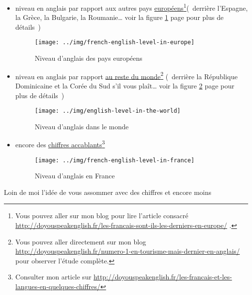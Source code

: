 \begin{itemize}
\item niveau en anglais par rapport aux autres pays
  \href{http://doyouspeakenglish.fr/les-francais-sont-ils-les-derniers-en-europe/}{européens}\footnote{Vous
    pouvez aller sur mon blog pour lire l'article consacré
    \url{http://doyouspeakenglish.fr/les-francais-sont-ils-les-derniers-en-europe/} .}(~derrière l'Espagne, la Grèce, la Bulgarie, la Roumanie\ldots{} voir la figure
  \ref{fig:1} page \pageref{fig:1} pour plus de détails~)
  \begin{figure}[h]
    \centering
    \caption[L'anglais en Europe]{Niveau d'anglais des
      pays européens}\vspace{.1cm}
    \texttt{[image: ../img/french-english-level-in-europe]}
    
    \label{fig:1}
  \end{figure}
\item niveau en anglais par rapport \href{http://doyouspeakenglish.fr/numero-1-en-tourisme-mais-dernier-en-anglais/}{au
    reste du monde}\footnote{Vous pouvez aller directement sur mon blog
  \url{http://doyouspeakenglish.fr/numero-1-en-tourisme-mais-dernier-en-anglais/} pour observer l'étude complète.}
(~derrière la République Dominicaine et la Corée du Sud s'il vous
plaît\ldots{} voir la figure \ref{fig:2} page \pageref{fig:2} pour
plus de détails~)
  \begin{figure}[h]
    \centering
    \caption[L'anglais dans le monde]{Niveau d'anglais dans le monde}\vspace{.1cm}
    \texttt{[image: ../img/english-level-in-the-world]}
    
    \label{fig:2}
  \end{figure}
\item encore des
  \href{http://doyouspeakenglish.fr/les-francais-et-les-langues-en-quelques-chiffres/}{chiffres
    accablants}\footnote{Consulter mon article sur \url{http://doyouspeakenglish.fr/les-francais-et-les-langues-en-quelques-chiffres/}}
   
  \begin{figure}[h]
    \centering
    \caption[L'anglais en France]{Niveau d'anglais en France}\vspace{.1cm}
    \texttt{[image: ../img/french-english-level-in-france]}
    
    \label{fig:3}
  \end{figure}
\end{itemize}
Loin de moi l'idée de vous assommer avec des chiffres et encore moins
